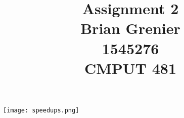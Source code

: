 \documentclass[11pt]{report}
\title{Assignment 2
\\Brian Grenier
\\1545276
\\CMPUT 481}
\begin{document}
\maketitle

\texttt{[image: speedups.png]}
\end{document}
